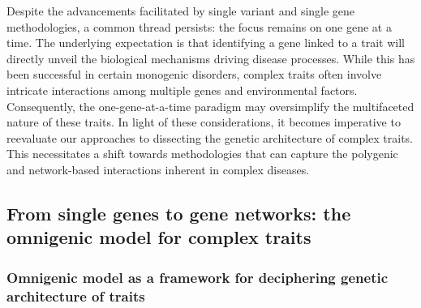 Despite the advancements facilitated by single variant and single gene methodologies, a common thread persists: the focus remains on one gene at a time.
The underlying expectation is that identifying a gene linked to a trait will directly unveil the biological mechanisms driving disease processes.
While this has been successful in certain monogenic disorders, complex traits often involve intricate interactions among multiple genes and environmental factors.
Consequently, the one-gene-at-a-time paradigm may oversimplify the multifaceted nature of these traits.
In light of these considerations, it becomes imperative to reevaluate our approaches to dissecting the genetic architecture of complex traits.
This necessitates a shift towards methodologies that can capture the polygenic and network-based interactions inherent in complex diseases.

\hypertarget{from-single-genes-to-gene-networks-the-omnigenic-model-for-complex-traits}{%
\subsection{From single genes to gene networks: the omnigenic model for complex traits}\label{from-single-genes-to-gene-networks-the-omnigenic-model-for-complex-traits}}

\hypertarget{omnigenic-model-as-a-framework-for-deciphering-genetic-architecture-of-traits}{%
\subsubsection{Omnigenic model as a framework for deciphering genetic architecture of traits}\label{omnigenic-model-as-a-framework-for-deciphering-genetic-architecture-of-traits}}

